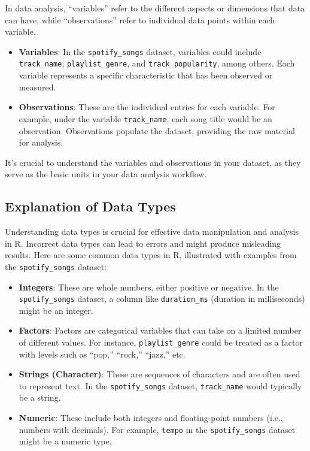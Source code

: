 \documentclass[
]{book}
\begin{document}
In data analysis, ``variables'' refer to the different aspects or dimensions that data can have, while ``observations'' refer to individual data points within each variable.

\begin{itemize}
\item
  \textbf{Variables}: In the \texttt{spotify\_songs} dataset, variables could include \texttt{track\_name}, \texttt{playlist\_genre}, and \texttt{track\_popularity}, among others. Each variable represents a specific characteristic that has been observed or measured.
\item
  \textbf{Observations}: These are the individual entries for each variable. For example, under the variable \texttt{track\_name}, each song title would be an observation. Observations populate the dataset, providing the raw material for analysis.
\end{itemize}

It's crucial to understand the variables and observations in your dataset, as they serve as the basic units in your data analysis workflow.

\hypertarget{explanation-of-data-types}{%
\subsection*{Explanation of Data Types}\label{explanation-of-data-types}}

Understanding data types is crucial for effective data manipulation and analysis in R. Incorrect data types can lead to errors and might produce misleading results. Here are some common data types in R, illustrated with examples from the \texttt{spotify\_songs} dataset:

\begin{itemize}
\item
  \textbf{Integers}: These are whole numbers, either positive or negative. In the \texttt{spotify\_songs} dataset, a column like \texttt{duration\_ms} (duration in milliseconds) might be an integer.
\item
  \textbf{Factors}: Factors are categorical variables that can take on a limited number of different values. For instance, \texttt{playlist\_genre} could be treated as a factor with levels such as ``pop,'' ``rock,'' ``jazz,'' etc.
\item
  \textbf{Strings (Character)}: These are sequences of characters and are often used to represent text. In the \texttt{spotify\_songs} dataset, \texttt{track\_name} would typically be a string.
\item
  \textbf{Numeric}: These include both integers and floating-point numbers (i.e., numbers with decimals). For example, \texttt{tempo} in the \texttt{spotify\_songs} dataset might be a numeric type.
\end{itemize}
\end{document}

